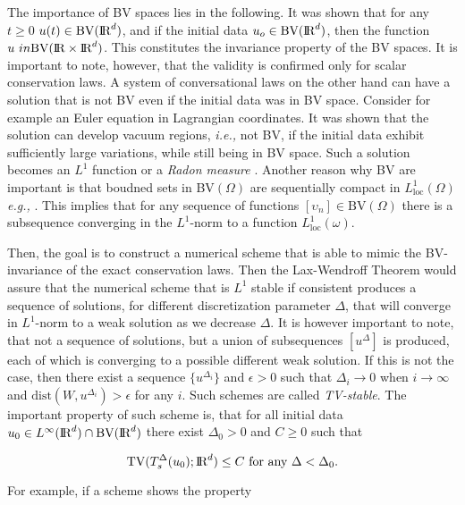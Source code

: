 The importance of BV spaces lies in the following. 
It was shown \cite{Conway:1966} that for any $t\geq 0$ $u(t)\in \text{BV}(\text{I\!R}^d)$, and if the initial data $u_o\in \text{BV}(\text{I\!R}^d)$, then the function $u \ in \text{BV}(\text{I\!R}\times\text{I\!R}^d)$. 
This constitutes the invariance property of the BV spaces. 
It is important to note, however, that the validity is confirmed only for scalar conservation laws. 
A system of conversational laws on the other hand can have a solution that is not BV even if the initial data was in BV space. 
Consider for example an Euler equation in Lagrangian coordinates. 
It was shown that the solution can develop vacuum regions, \textit{i.e.,} not BV, if the initial data exhibit sufficiently large variations, while still being in BV space. 
Such a solution becomes an $L^1$ function or a \textit{Radon measure} \cite{Chen:2006}. 
Another reason why BV are important is that boudned sets in BV$(\Omega)$ are sequentially compact in $L^1 _{\text{loc}}(\Omega)$ \textit{e.g.,} \cite{Luigi:2002}. 
This implies that for any sequence of functions $[\upsilon_n]\in\text{BV}(\Omega)$ there is a subsequence converging in the $L^1$-norm to a function $L^1 _{\text{loc}}(\omega)$. 

Then, the goal is to construct a numerical scheme that is able to mimic the BV-invariance of the exact conservation laws. 
Then the Lax-Wendroff Theorem would assure that the numerical scheme that is $L^1$ stable if consistent produces a sequence of solutions, for different discretization parameter $\Delta$, that will converge in $L^1$-norm to a weak solution as we decrease $\Delta$. 
It is however important to note, that not a sequence of solutions, but a union of subsequences $[u^{\Delta}]$ is produced, each of which is converging to a possible different weak solution. 
If this is not the case, then there exist a sequence $\{u^{\Delta_i}\}$ and $\epsilon > 0$ such that $\Delta_i\rightarrow 0 $ when $i\rightarrow \infty$ and $\text{dist}(W,u^{\Delta_i})>\epsilon$ for any $i$. 
Such schemes are called \textit{TV-stable}. The important property of such scheme is, that for all initial data $u_0\in L^{\infty}(\text{I\!R}^d)\cap \text{BV}(\text{I\!R}^d)$ there exist $\Delta_0 > 0$ and $C\geq 0$ such that 

\begin{equation}
\text{TV}(T_s ^{\Delta}(u_0); \text{I\!R}^d)\leq C \text{ for any } \Delta < \Delta_0.
\end{equation}

For example, if a scheme shows the property 

